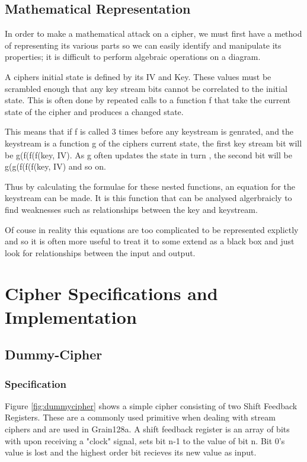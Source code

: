 \documentclass{report}
\begin{document}

\section{Mathematical Representation}
In order to make a mathematical attack on a cipher, we must first have a method
of representing its various parts so we can easily identify and manipulate its properties; it is difficult to perform algebraic operations on a diagram.

A ciphers initial state is defined by its IV and Key. These values must be scrambled enough that any key stream bits cannot be correlated to the initial state. This is often done by repeated calls to a function f that take the current state of the cipher and produces a changed state.

This means that if f is called 3 times before any keystream is genrated, and the keystream is a function g of the ciphers current state, the first key stream bit will be g(f(f(f(key, IV). As g often updates the state in turn , the second bit will be g(g(f(f(f(key, IV) and so on.

Thus by calculating the formulae for these nested functions, an equation for the keystream can be made. It is this function that can be analysed algerbraicly to find weaknesses such as relationships between the key and keystream.


Of couse in reality this equations are too complicated to be represented explictly and so it is often more useful to treat it to some extend as a black box and just look for relationships between the input and output.
\chapter{Cipher Specifications  and Implementation}
\section{Dummy-Cipher}
\subsection{Specification}
Figure \ref{fig:dummycipher} shows a simple cipher consisting of two Shift Feedback Registers. These are a commonly used primitive when dealing with stream ciphers and are used in Grain128a. A shift feedback register is an array of bits with upon receiving a "clock" signal, sets bit n-1 to the value of bit n. Bit 0's value is lost and the highest order bit recieves its new value as input.
\end{document}
